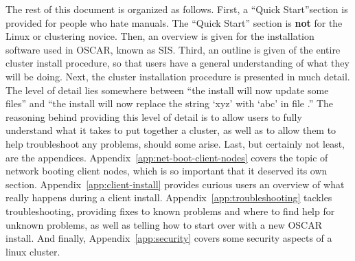 The rest of this document is organized as follows.  First, a ``Quick
Start''section is provided for people who hate manuals.  The ``Quick
Start'' section is {\bf not} for the Linux or clustering novice. Then,
an overview is given for the installation software used in OSCAR,
known as SIS.  Third, an outline is given of the entire cluster
install procedure, so that users have a general understanding of what
they will be doing.  Next, the cluster installation procedure is
presented in much detail.  The level of detail lies somewhere between
``the install will now update some files'' and ``the install will now
replace the string `xyz' with `abc' in file .'' The
reasoning behind providing this level of detail is to allow users to
fully understand what it takes to put together a cluster, as well as
to allow them to help troubleshoot any problems, should some arise.
Last, but certainly not least, are the appendices.
Appendix~\ref{app:net-boot-client-nodes} covers the topic of network
booting client nodes, which is so important that it deserved its own
section.  Appendix~\ref{app:client-install} provides curious users an
overview of what really happens during a client install.
Appendix~\ref{app:troubleshooting} tackles troubleshooting, providing
fixes to known problems and where to find help for unknown problems,
as well as telling how to start over with a new OSCAR install.  And
finally, Appendix~\ref{app:security} covers some security aspects of a
linux cluster.

